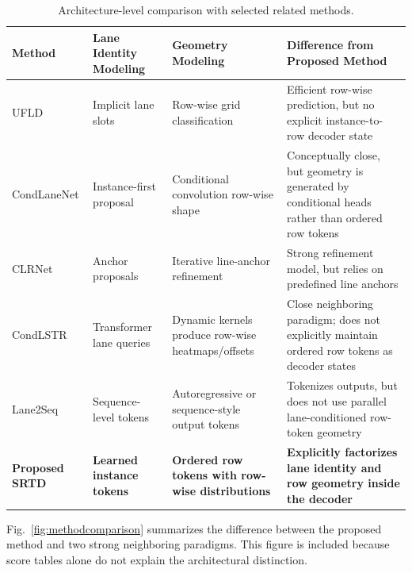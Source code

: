 \documentclass[conference]{IEEEtran}
\newcommand{\method}{SRTD}
\begin{document}
\begin{table}[t]
\centering
\caption{Architecture-level comparison with selected related methods.}
\label{tab:archcompare}
\begin{tabularx}{\linewidth}{lXXX}
\toprule
Method & Lane Identity Modeling & Geometry Modeling & Difference from Proposed Method \\
\midrule
UFLD & Implicit lane slots & Row-wise grid classification & Efficient row-wise prediction, but no explicit instance-to-row decoder state \\
CondLaneNet & Instance-first proposal & Conditional convolution row-wise shape & Conceptually close, but geometry is generated by conditional heads rather than ordered row tokens \\
CLRNet & Anchor proposals & Iterative line-anchor refinement & Strong refinement model, but relies on predefined line anchors \\
CondLSTR & Transformer lane queries & Dynamic kernels produce row-wise heatmaps/offsets & Close neighboring paradigm; does not explicitly maintain ordered row tokens as decoder states \\
Lane2Seq & Sequence-level tokens & Autoregressive or sequence-style output tokens & Tokenizes outputs, but does not use parallel lane-conditioned row-token geometry \\
\textbf{Proposed \method} & \textbf{Learned instance tokens} & \textbf{Ordered row tokens with row-wise distributions} & \textbf{Explicitly factorizes lane identity and row geometry inside the decoder} \\
\bottomrule
\end{tabularx}
\end{table}

Fig.~\ref{fig:methodcomparison} summarizes the difference between the proposed method and two strong neighboring paradigms. This figure is included because score tables alone do not explain the architectural distinction.
\end{document}
